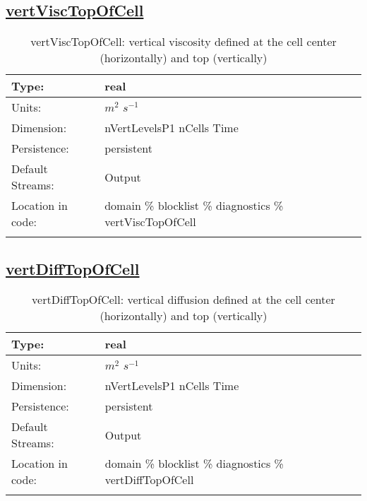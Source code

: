 \subsection[vertViscTopOfCell]{\hyperref[sec:var_tab_diagnostics]{vertViscTopOfCell}}
\label{subsec:var_sec_diagnostics_vertViscTopOfCell}
\begin{center}
\begin{longtable}{| p{2.0in} | p{4.0in} |}
        \hline 
        Type: & real \\
        \hline 
        Units: & $m^2$ $s^{-1}$ \\
        \hline 
        Dimension: & nVertLevelsP1 nCells Time \\
        \hline 
        Persistence: & persistent \\
        \hline 
		 Default Streams: & Output  \\
        \hline 
		 Location in code: & domain \% blocklist \% diagnostics \% vertViscTopOfCell \\
		 \hline 
    \caption{vertViscTopOfCell: vertical viscosity defined at the cell center (horizontally) and top (vertically)}
\end{longtable}
\end{center}
\subsection[vertDiffTopOfCell]{\hyperref[sec:var_tab_diagnostics]{vertDiffTopOfCell}}
\label{subsec:var_sec_diagnostics_vertDiffTopOfCell}
\begin{center}
\begin{longtable}{| p{2.0in} | p{4.0in} |}
        \hline 
        Type: & real \\
        \hline 
        Units: & $m^2$ $s^{-1}$ \\
        \hline 
        Dimension: & nVertLevelsP1 nCells Time \\
        \hline 
        Persistence: & persistent \\
        \hline 
		 Default Streams: & Output  \\
        \hline 
		 Location in code: & domain \% blocklist \% diagnostics \% vertDiffTopOfCell \\
		 \hline 
    \caption{vertDiffTopOfCell: vertical diffusion defined at the cell center (horizontally) and top (vertically)}
\end{longtable}
\end{center}

